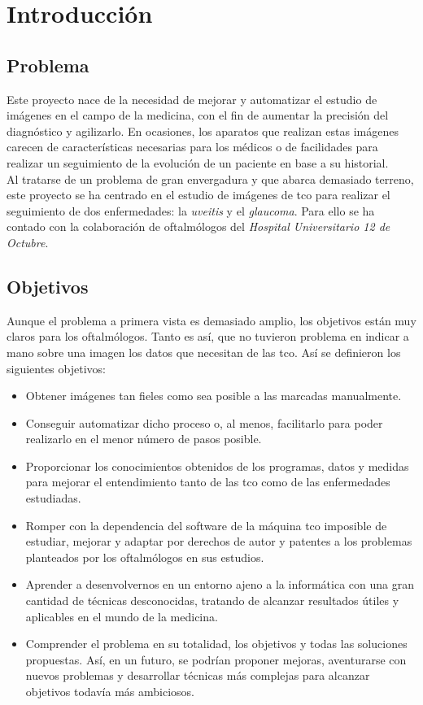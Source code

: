 \chapter{Introducción}
\section{Problema}
Este proyecto nace de la necesidad de mejorar y automatizar el estudio 
de imágenes en el campo de la medicina, con el fin de aumentar la precisión 
del diagnóstico y agilizarlo. En ocasiones, los aparatos que realizan 
estas imágenes carecen de características necesarias para los médicos 
o de facilidades para realizar un seguimiento de la evolución de un paciente 
en base a su historial. \\
Al tratarse de un problema de gran envergadura y que abarca demasiado
terreno, este proyecto se ha centrado en el estudio de imágenes de \gls{tco}
para realizar el seguimiento de dos enfermedades: la \emph{\gls{uveitis}} y
el \emph{\gls{glaucoma}}. Para ello se ha contado con la colaboración de
oftalmólogos del \emph{Hospital Universitario 12 de Octubre}.

\section{Objetivos}
Aunque el problema a primera vista es demasiado amplio,
los objetivos están muy claros para los oftalmólogos. Tanto es así, 
que no tuvieron problema en indicar a mano sobre una imagen los datos que 
necesitan de las \gls{tco}. Así se definieron los siguientes objetivos:
\begin{itemize}
\item Obtener imágenes tan fieles como sea posible a las marcadas
  manualmente.
\item Conseguir automatizar dicho proceso o, al menos,
  facilitarlo para poder realizarlo en el menor número de pasos posible.
\item Proporcionar los conocimientos obtenidos de los programas, datos y
  medidas para mejorar el entendimiento tanto de las \gls{tco}
  como de las enfermedades estudiadas.
\item Romper con la dependencia del software de la máquina \gls{tco}
  imposible de estudiar, mejorar y adaptar por derechos de autor y
  patentes a los problemas planteados por los oftalmólogos en sus
  estudios.
\item Aprender a desenvolvernos en un entorno ajeno a la informática
  con una gran cantidad de técnicas desconocidas, tratando de alcanzar
  resultados útiles y aplicables en el mundo de la medicina.
\item Comprender el problema en su totalidad, los objetivos y todas
  las soluciones propuestas. Así, en un futuro, se podrían proponer
  mejoras, aventurarse con nuevos problemas y desarrollar técnicas más
  complejas para alcanzar objetivos todavía más ambiciosos.
\end{itemize}
